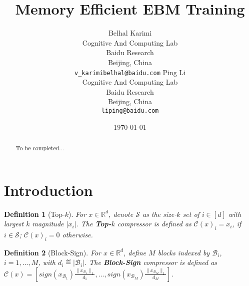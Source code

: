 \documentclass[11pt]{article}
\newtheorem{definition}{Definition}
\begin{document}
\title{Memory Efficient EBM Training}

\author{
  Belhal Karimi \\
  Cognitive And Computing Lab\\
  Baidu Research\\
  Beijing, China \\
  \texttt{v_karimibelhal@baidu.com} 
   \And
  Ping Li \\
  Cognitive And Computing Lab\\
  Baidu Research\\
  Beijing, China \\
  \texttt{liping@baidu.com} \\
}

\date{\today}

\maketitle

\begin{abstract}
To be completed...
\end{abstract}

\section{Introduction}\label{sec:introduction}

\begin{definition}[Top-$k$]\label{def:topk}
For $x\in\mathbb R^d$, denote $\mathcal S$ as the size-$k$ set of $i\in[d]$ with largest $k$ magnitude $|x_i|$. The \textbf{Top-$k$} compressor is defined as $\mathcal C(x)_i=x_i$, if $i\in\mathcal S$; $\mathcal C(x)_i=0$ otherwise.
\end{definition}

\begin{definition}[Block-Sign]\label{def:sign}
For $x\in\mathbb R^d$, define $M$ blocks indexed by $\mathcal B_i$, $i=1,...,M$, with $d_i\eqdef |\mathcal B_i|$. The \textbf{Block-Sign} compressor is defined as $\mathcal C(x)=[sign(x_{\mathcal B_1})\frac{\|x_{\mathcal B_1}\|_1}{d_1},..., sign(x_{\mathcal B_M}) \frac{\|x_{\mathcal B_M}\|_1}{d_M}]$. 
\end{definition}
\end{document}
